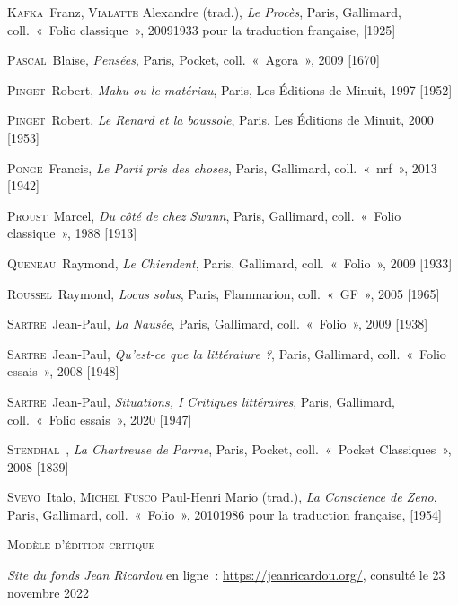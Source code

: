 \documentclass[12pt, a4paper]{article}
\begin{document}
	\textsc{Kafka}~Franz, \textsc{Vialatte} Alexandre (trad.), \textit{Le Procès}, Paris, Gallimard, coll.~«~Folio classique~», 20091933 pour la traduction française,  [1925]\par 
	\textsc{Pascal}~Blaise, \textit{Pensées}, Paris, Pocket, coll.~«~Agora~», 2009 [1670]\par 
	\textsc{Pinget}~Robert, \textit{Mahu ou le matériau}, Paris, Les Éditions de Minuit, 1997 [1952]\par 
	\textsc{Pinget}~Robert, \textit{Le Renard et la boussole}, Paris, Les Éditions de Minuit, 2000 [1953]\par 
	\textsc{Ponge}~Francis, \textit{Le Parti pris des choses}, Paris, Gallimard, coll.~«~nrf~», 2013 [1942]\par 
	\textsc{Proust}~Marcel, \textit{Du côté de chez Swann}, Paris, Gallimard, coll.~«~Folio classique~», 1988 [1913]\par 
	\textsc{Queneau}~Raymond, \textit{Le Chiendent}, Paris, Gallimard, coll.~«~Folio~», 2009 [1933]\par 
	\textsc{Roussel}~Raymond, \textit{Locus solus}, Paris, Flammarion, coll.~«~GF~», 2005 [1965]\par 
	\textsc{Sartre}~Jean-Paul, \textit{La Nausée}, Paris, Gallimard, coll.~«~Folio~», 2009 [1938]\par 
	\textsc{Sartre}~Jean-Paul, \textit{Qu'est-ce que la littérature ?}, Paris, Gallimard, coll.~«~Folio essais~», 2008 [1948]\par 
	\textsc{Sartre}~Jean-Paul, \textit{Situations, I Critiques littéraires}, Paris, Gallimard, coll.~«~Folio essais~», 2020 [1947]\par 
	\textsc{Stendhal}~, \textit{La Chartreuse de Parme}, Paris, Pocket, coll.~«~Pocket Classiques~», 2008 [1839]\par 
	\textsc{Svevo}~Italo, \textsc{Michel Fusco} Paul-Henri Mario (trad.), \textit{La Conscience de Zeno}, Paris, Gallimard, coll.~«~Folio~», 20101986 pour la traduction française,  [1954]\par 
	
		\vspace*{2cm}
		\setlength{\parindent}{0cm}
{\large\textsc{Modèle d'édition critique}}
		\vspace*{1cm}
		\setlength{\parindent}{25pt}
		
		
		

		
		
		\textit{Site du fonds Jean Ricardou} en ligne~: \hyperlink{https://jeanricardou.org/}{https://jeanricardou.org/}, consulté le 23 novembre 2022\par
\end{document}

